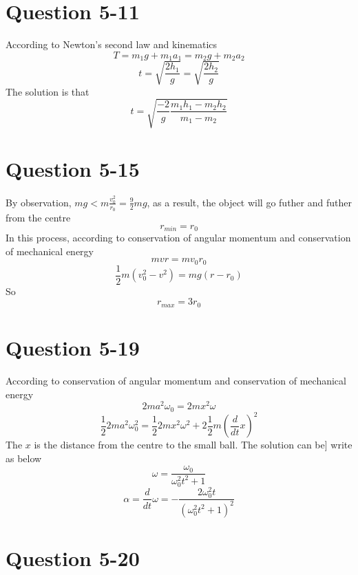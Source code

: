 \documentclass[12pt,a4paper,twocolumn]{article}%
\begin{document}
		\section{Question 5-11}
		\noindent According to Newton's second law and kinematics
		\begin{equation}
			T=m_1g+m_1a_1=m_2g+m_2a_2
		\end{equation}
		\begin{equation}
			t=\sqrt{\frac{2h_1}{g}}=\sqrt{\frac{2h_2}{g}}
		\end{equation}
		The solution is that
		$$
		t=\sqrt{\frac{-2}{g}\frac{m_1h_1-m_2h_2}{m_1-m_2}}
		$$
		\section{Question 5-15}
		\noindent By observation, $mg<m\frac{v_0^2}{r_0}=\frac{9}{2}mg$, as a result, the object will go futher and futher from the centre
		$$
		r_{min}=r_0
		$$
		In this process, according to conservation of angular momentum and conservation of mechanical energy
		\begin{equation}
			mvr=mv_0r_0
		\end{equation}
		\begin{equation}
			\frac{1}{2}m\left( v_{0}^{2}-v^2 \right) =mg\left( r-r_0 \right) 
		\end{equation}
		So $$r_{max}=3r_0$$
		\section{Question 5-19}
		\noindent According to conservation of angular momentum and conservation of mechanical energy
		\begin{equation}
			2ma^2\omega _0=2mx^2\omega 
		\end{equation}
		\begin{equation}
			\frac{1}{2}2ma^2\omega _{0}^{2}=\frac{1}{2}2mx^2\omega ^2+2\frac{1}{2}m\left( \frac{d}{dt}x \right) ^2
		\end{equation}
		The $x$ is the distance from the centre to the small ball. The solution can be] write as below
		$$
		\omega=\frac{\omega_0}{\omega_0^2t^2+1}
		$$
		$$
		\alpha=\frac{d}{dt}\omega=-\frac{2\omega_0^2t}{(\omega_0^2t^2+1)^2}
		$$
		\section{Question 5-20}
\end{document}
